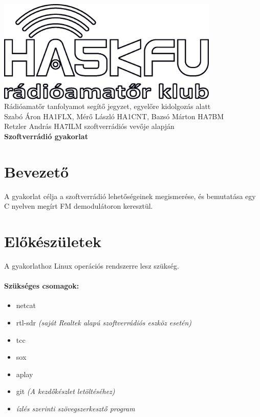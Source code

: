 \documentclass[12pt,a4paper]{article}
\begin{document}
\begin{center}
\includegraphics[width=300pt,keepaspectratio]{figures/ha5kfu.eps}
\\[0.5cm]
Rádióamatőr tanfolyamot segítő jegyzet, egyelőre kidolgozás alatt \\
Szabó Áron HA1FLX, Mérő László HA1CNT, Bazsó Márton HA7BM %
\\
Retzler András HA7ILM szoftverrádiós vevője alapján
\\[1cm]

{\huge \bfseries Szoftverrádió gyakorlat \\[2cm]}



\end{center}

\renewcommand{\contentsname}{Tartalom}\tableofcontents 
\newpage

\newpage

\section{Bevezető}
A gyakorlat célja a szoftverrádió lehetőségeinek megismerése, és bemutatása egy C nyelven megírt FM demodulátoron keresztül.

\section{Előkészületek}
A gyakorlathoz Linux operációs rendszerre lesz szükség.

\paragraph{Szükséges csomagok:} 
\begin{itemize}
	\item netcat
	\item rtl-sdr \textit{(saját Realtek alapú szoftverrádiós eszköz esetén)}
	\item tcc
	\item sox
	\item aplay
	\item git \textit{(A kezdőkészlet letöltéséhez)}
	\item \textit{ízlés szerinti szövegszerkesztő program }

\end{itemize}
\end{document}
